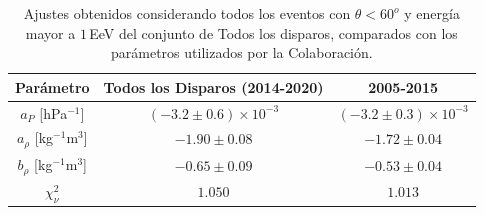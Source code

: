 \begin{table}[H]
  \centering
  \begin{tabular}{c|c|c}
  {Parámetro}                 & Todos los Disparos (2014-2020)& {2005-2015}    \cite{aab2017impact}              \\ \hline \hline
  $a_P$ [hPa$^{-1}$]          & $(-3.2 \pm 0.6)\times 10^{-3}$& $(-3.2 \pm 0.3)\times 10^{-3}$    \\ \hline
  $a_\rho$ [kg$^{-1}$m$^3$]   & $-1.90 \pm 0.08 $             & $-1.72 \pm 0.04$                  \\ \hline
  $b_\rho$ [kg$^{-1}$m$^3$]   & $-0.65 \pm 0.09$              & $-0.53 \pm 0.04$                  \\ \hline
  $\chi^2_\nu$                & $1.050$                       & $1.013$                           \\ 
  \end{tabular} 
  \caption{Ajustes obtenidos considerando todos los eventos con $\theta<60^o$ y energía mayor a $1\,$EeV del conjunto de Todos los disparos, comparados con los parámetros utilizados por la Colaboración.} \label{tabla:parametros_ALL}
\end{table}


